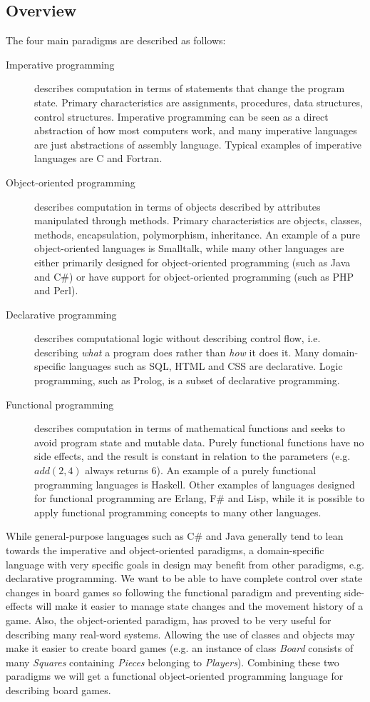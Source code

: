 \subsection{Overview}
The four main paradigms are described as follows:\cite{fourparadigms}
\begin{description}
\item[Imperative programming] describes computation in terms of statements that
  change the program state. Primary characteristics are assignments, procedures,
  data structures, control structures. Imperative programming can be seen as a
  direct abstraction of how most computers work, and many imperative languages
  are just abstractions of assembly language. Typical examples of imperative
  languages are C and Fortran.
\item[Object-oriented programming] describes computation in terms of objects
  described by attributes manipulated through methods. Primary characteristics
  are objects, classes, methods, encapsulation, polymorphism, inheritance. An
  example of a pure object-oriented languages is Smalltalk, while many other
  languages are either primarily designed for object-oriented programming (such
  as Java and C\#) or have support for object-oriented programming (such as PHP
  and Perl).
\item[Declarative programming] describes computational logic without describing
  control flow, i.e. describing {\em what} a program does rather than {\em how}
  it does it. Many domain-specific languages such as SQL, HTML and CSS are
  declarative. Logic programming, such as Prolog, is a subset of declarative
  programming.
\item[Functional programming] describes computation in terms of mathematical
  functions and seeks to avoid program state and mutable data. Purely functional
  functions have no side effects, and the result is constant in relation to the
  parameters (e.g. $add(2, 4)$ always returns $6$). An example of a purely
  functional programming languages is Haskell. Other examples of languages
  designed for functional programming are Erlang, F\# and Lisp, while it is
  possible to apply functional programming concepts to many other languages.
\end{description}


While general-purpose languages such as C\# and Java generally tend to lean
towards the imperative and object-oriented paradigms, a domain-specific
language with very specific goals in design may benefit from other paradigms,
e.g. declarative programming. We want to be able to have complete control
over state changes in board games so following the functional paradigm
and preventing side-effects will make it easier to manage state changes
and the movement history of a game. Also, the object-oriented paradigm,
has proved to be very useful for describing many real-word systems. Allowing
the use of classes and objects may make it easier to create board games
(e.g. an instance of class \emph{Board} consists of many \emph{Squares} 
containing \emph{Pieces} belonging to \emph{Players}). Combining these two
paradigms we will get a functional object-oriented programming language
for describing board games.

